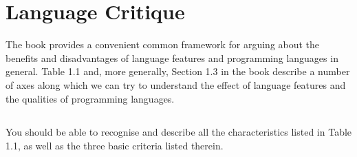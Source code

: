\section{Language Critique}\label{sec:Language_Critique}
The book provides a convenient common framework for arguing about the benefits and disadvantages of language features and programming languages in general.
Table 1.1 and, more generally, Section 1.3 in the book describe a number of axes along which we can try to understand the effect of language features and the qualities of programming languages.

\subsection{}\label{subsec:Criteria}
You should be able to recognise and describe all the characteristics listed in Table 1.1, as well as the three basic criteria listed therein.
